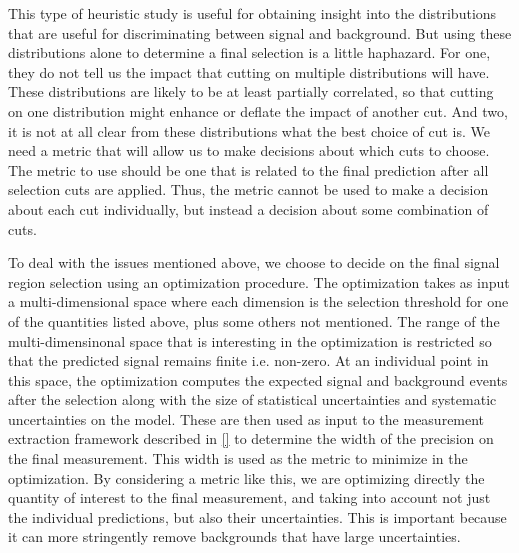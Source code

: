 This type of heuristic study is useful for obtaining insight into
the distributions that are useful for discriminating 
between signal and background.  But using these distributions
alone to determine a final selection is a little haphazard.
For one, they do not tell us the impact that cutting on multiple
distributions will have.  These distributions are likely to be 
at least partially correlated, so that cutting on one distribution might
enhance or deflate the impact of another cut. 
And two, it is not at all clear from these distributions
what the best choice of cut is. We need a metric that will
allow us to make decisions about which cuts to choose.
The metric to use should be one that is 
related to the final prediction after all selection cuts are applied.
Thus, the metric cannot be used to make a decision about each 
cut individually, but instead a decision about some combination of cuts.

To deal with the issues mentioned above, we choose to 
decide on the final signal region selection using an optimization
procedure. The optimization takes as input a multi-dimensional 
space where each dimension is the selection threshold
for one of the quantities listed above, plus some others not mentioned.
The range of the multi-dimensinonal space that is 
interesting in the optimization is restricted so that the 
predicted signal remains finite i.e. non-zero.
At an individual point in this space, the optimization computes
the expected signal and background events after the selection
along with the size of statistical uncertainties
and systematic uncertainties on the model. 
These are then used as input to the measurement extraction framework
described in \sec\ref{} to determine the width of the precision
on the final measurement. 
This width is used as the metric to minimize in the optimization.
By considering a metric like this, we are optimizing directly
the quantity of interest to the final measurement, and taking
into account not just the individual predictions, but also their
uncertainties. This is important because it can more stringently
remove backgrounds that have large uncertainties.

